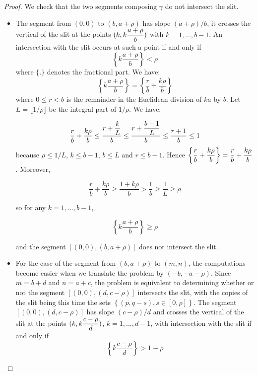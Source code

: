\documentclass{article}
\theoremstyle{definition}
\begin{document}
\begin{proof}
	We check that the two segments composing $\gamma$ do not intersect the slit.
	
	\begin{itemize}\renewcommand{\labelitemi}{$\bullet$}
		
		\item The segment from $(0,0)$ to $(b,a+\rho)$ has slope $(a+\rho)/b$, it crosses the vertical of the slit at the points $(k,k \mathlarger{\frac{a+\rho}{b}})$ with $k=1,...,b-1$. 
		An intersection with the slit occurs at such a point if and only if 
		$$\left \{ k\frac{a+\rho}{b} \right \} < \rho$$
		where $\{. \}$ denotes the fractional part. We have:
		$$\left \{ k\frac{a+\rho}{b} \right \}  = \left \{\frac{r}{b} +\frac{k\rho}{b} \right \} $$
		where $0\le r< b$ is the remainder in the Euclidean division of $ka$ by $b$. Let $L = \lfloor 1/\rho \rfloor$ be the integral part of $1/\rho$. We have:
		
		$$ \frac{r}{b}+\frac{k \rho}{b}  \le \frac{r+\mathlarger{\frac{k}{L}}}{b}
		\\ \le \frac{r+\mathlarger{\frac{b-1}{L}}}{b} 
		\\ \le \frac{r+1}{b} 
		\\ \le 1
		$$
		because $\rho \le 1/L$, $k\le b-1$, $b\le L$ and $r\le b-1$. Hence $ \left \{ \mathlarger{\frac{r}{b} + \frac{k\rho}{b}} \right \} = \mathlarger{\frac{r}{b} + \frac{k\rho}{b}}$. Moreover,
		
		$$\frac{r}{b} + \frac{k\rho}{b} \ge \frac{1+k\rho}{b} > \frac{1}{b} \ge \frac{1}{L} \ge \rho$$
		
		so for any $k=1,...,b-1$,
		
		$$\left  \{ k\frac{a+\rho}{b}  \right \} \ge \rho$$
		
		and the segment $[(0,0),(b,a+\rho)]$ does not intersect the slit.
		
		\item For the case of the segment from $(b,a+\rho)$ to $(m,n)$, the computations become easier when we translate the problem by $(-b,-a-\rho)$. Since $m=b+d$ and $n=a+c$, the problem is equivalent to determining whether or not the segment $[(0,0),(d,c-\rho)]$ intersects the slit, with the copies of the slit being this time the sets $\left \{ (p,q-s), s\in [0,\rho] \right \}$. The segment $[(0,0),(d,c-\rho)]$ has slope $(c-\rho)/d$ and crosses the vertical of the slit at the points $(k,k\mathlarger{\frac{c-\rho}{d}})$, $k=1,...,d-1$, with intersection with the slit if and only if
		$$ \left  \{ k \frac{c-\rho}{d} \right \} > 1-\rho $$
		

\end{itemize}
\end{proof}
\end{document}
